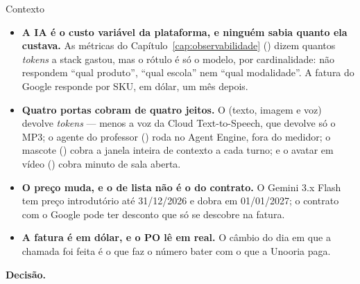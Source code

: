 \begin{especificacao}{Contexto}
\begin{itemize}
  \item \textbf{A IA é o custo variável da plataforma, e ninguém sabia quanto
    ela custava.} As métricas do Capítulo~\ref{cap:observabilidade}
    () dizem quantos \emph{tokens} a stack gastou, mas o rótulo é
    só o modelo, por cardinalidade: não respondem \enquote{qual produto},
    \enquote{qual escola} nem \enquote{qual modalidade}. A fatura do Google
    responde por SKU, em dólar, um mês depois.
  \item \textbf{Quatro portas cobram de quatro jeitos.} O 
    (texto, imagem e voz) devolve \emph{tokens} --- menos a voz da Cloud
    Text-to-Speech, que devolve só o MP3; o agente do professor
    () roda no Agent Engine, fora do medidor; o mascote
    () cobra a janela inteira de contexto a cada turno; e o
    avatar em vídeo () cobra minuto de sala aberta.
  \item \textbf{O preço muda, e o de lista não é o do contrato.} O Gemini 3.x
    Flash tem preço introdutório até 31/12/2026 e dobra em 01/01/2027; o
    contrato com o Google pode ter desconto que só se descobre na fatura.
  \item \textbf{A fatura é em dólar, e o PO lê em real.} O câmbio do dia em que
    a chamada foi feita é o que faz o número bater com o que a Unooria paga.
\end{itemize}
\end{especificacao}

\textbf{Decisão.}

